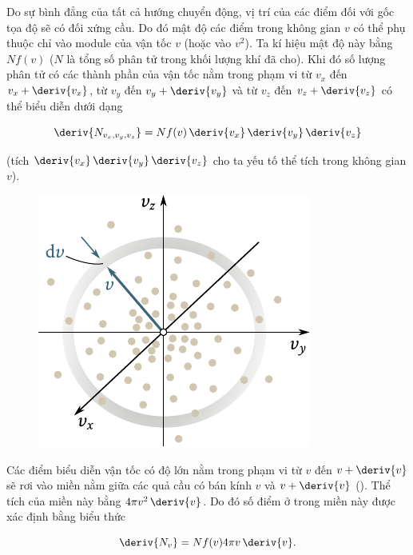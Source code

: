 Do sự bình đẳng của tất cả hướng chuyển động, vị trí của các điểm đối với gốc tọa độ sẽ có đối xứng cầu. Do đó mật độ các điểm trong không gian $v$ có thể phụ thuộc chỉ vào module của vận tốc $v$ (hoặc vào $v^2$). Ta kí hiệu mật độ này bằng $Nf(v)$ ($N$ là tổng số phân tử trong khối lượng khí đã cho). Khi đó số lượng phân tử có các thành phần của vận tốc nằm trong phạm vi từ $v_x$ đến $v_x+\deriv{v_x}$, từ $v_y$ đến $v_y+\deriv{v_y}$ và từ $v_z$ đến $v_z+\deriv{v_z}$ có thể biểu diễn dưới dạng

\begin{equation}\label{eq:11_40}
	\deriv{N_{v_x, v_y, v_z}} = Nf(v)\,\deriv{v_x}\,\deriv{v_y}\,\deriv{v_z}
\end{equation}

\noindent

(tích $\deriv{v_x}\,\deriv{v_y}\,\deriv{v_z}$ cho ta yếu tố thể tích trong không gian $v$).

\begin{figure}[!htb]
	\begin{center}
		\includegraphics[scale=1.0]{figures/ch_11/fig_11_15.pdf}
		\caption[]{}
		\label{fig:11_15}
	\end{center}
	\vspace{-0.8cm}
\end{figure}

Các điểm biểu diễn vận tốc có độ lớn nằm trong phạm vi từ $v$ đến $v+\deriv{v}$ sẽ rơi vào miền nằm giữa các quả cầu có bán kính $v$ và $v+\deriv{v}$ (). Thể tích của miền này bằng $4\pi v^2\,\deriv{v}$. Do đó số điểm ở trong miền này được xác định bằng biểu thức

\begin{equation}\label{eq:11_41}
	\deriv{N_v} = Nf(v) 4\pi v\,\deriv{v}.
\end{equation}

